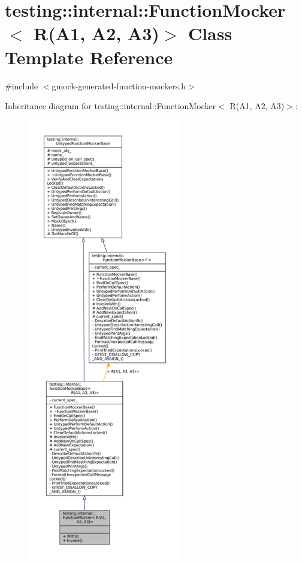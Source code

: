 \hypertarget{classtesting_1_1internal_1_1FunctionMocker_3_01R_07A1_00_01A2_00_01A3_08_4}{}\section{testing\+:\+:internal\+:\+:Function\+Mocker$<$ R(A1, A2, A3)$>$ Class Template Reference}
\label{classtesting_1_1internal_1_1FunctionMocker_3_01R_07A1_00_01A2_00_01A3_08_4}


{\ttfamily \#include $<$gmock-\/generated-\/function-\/mockers.\+h$>$}



Inheritance diagram for testing\+:\+:internal\+:\+:Function\+Mocker$<$ R(A1, A2, A3)$>$\+:
\nopagebreak
\begin{figure}[H]
\begin{center}
\leavevmode
\includegraphics[height=550pt]{classtesting_1_1internal_1_1FunctionMocker_3_01R_07A1_00_01A2_00_01A3_08_4__inherit__graph}
\end{center}
\end{figure}


